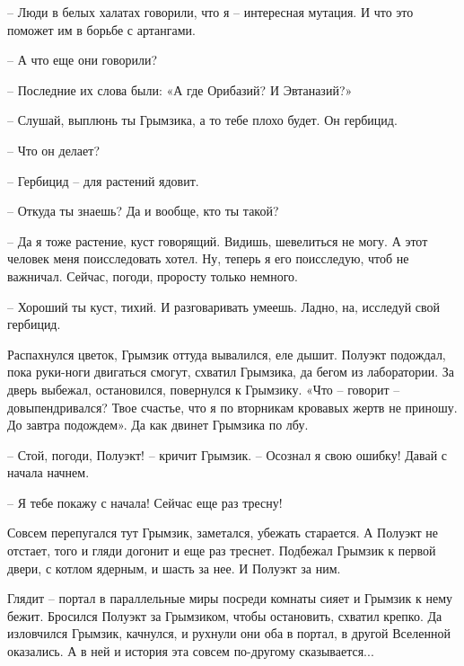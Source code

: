 \documentclass[ebook,oneside,final,openright]{memoir}
\begin{document}
– Люди в белых халатах говорили, что я – интересная мутация. И что это поможет им в борьбе с артангами.\par
– А что еще они говорили?\par
– Последние их слова были: «А где Орибазий? И Эвтаназий?»\par
– Слушай, выплюнь ты Грымзика, а то тебе плохо будет. Он гербицид.\par
– Что он делает?\par
– Гербицид – для растений ядовит.\par
– Откуда ты знаешь? Да и вообще, кто ты такой?\par
– Да я тоже растение, куст говорящий. Видишь, шевелиться не могу. А этот человек меня поисследовать хотел. Ну, теперь я его поисследую, чтоб не важничал. Сейчас, погоди, проросту только немного.\par
– Хороший ты куст, тихий. И разговаривать умеешь. Ладно, на, исследуй свой гербицид.\par
\par
Распахнулся цветок, Грымзик оттуда вывалился, еле дышит. Полуэкт подождал, пока руки-ноги двигаться смогут, схватил Грымзика, да бегом из лаборатории. За дверь выбежал, остановился, повернулся к Грымзику. «Что – говорит – довыпендривался? Твое счастье, что я по вторникам кровавых жертв не приношу. До завтра подождем». Да как двинет Грымзика по лбу.\par
\par
– Стой, погоди, Полуэкт! – кричит Грымзик. – Осознал я свою ошибку! Давай с начала начнем.\par
– Я тебе покажу с начала! Сейчас еще раз тресну!\par
\par
Совсем перепугался тут Грымзик, заметался, убежать старается. А Полуэкт не отстает, того и гляди догонит и еще раз треснет. Подбежал Грымзик к первой двери, с котлом ядерным, и шасть за нее. И Полуэкт за ним.\par
\par
Глядит – портал в параллельные миры посреди комнаты сияет и Грымзик к нему бежит. Бросился Полуэкт за Грымзиком, чтобы остановить, схватил крепко. Да изловчился Грымзик, качнулся, и рухнули они оба в портал, в другой Вселенной оказались. А в ней и история эта совсем по-другому сказывается...\par
\end{document}
